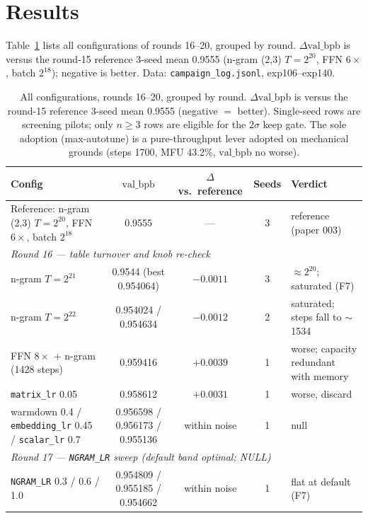 \documentclass{article}
\newcommand{\valbpb}{\mathrm{val\_bpb}}
\begin{document}
\section{Results}
\label{sec:results}

Table~\ref{tab:results} lists all configurations of rounds 16--20, grouped by round. $\Delta\valbpb$ is versus the round-15 reference 3-seed mean 0.9555 (n-gram (2,3) $T{=}2^{20}$, FFN $6\times$, batch $2^{18}$); negative is better. Data: \texttt{campaign\_log.jsonl}, exp106--exp140.

\begin{table}[t]
\caption{All configurations, rounds 16--20, grouped by round. $\Delta\valbpb$ is versus the round-15 reference 3-seed mean 0.9555 (negative $=$ better). Single-seed rows are screening pilots; only $n \geq 3$ rows are eligible for the $2\sigma$ keep gate. The sole adoption (max-autotune) is a pure-throughput lever adopted on mechanical grounds (steps 1700, MFU 43.2\%, $\valbpb$ no worse).}
\label{tab:results}
\vskip 0.15in
\begin{center}
\begin{small}
\begin{tabular}{lcccl}
\toprule
Config & $\valbpb$ & $\Delta$ vs.\ reference & Seeds & Verdict \\
\midrule
Reference: n-gram (2,3) $T{=}2^{20}$, FFN $6\times$, batch $2^{18}$ & 0.9555 & --- & 3 & reference (paper 003) \\
\midrule
\multicolumn{5}{l}{\emph{Round 16 --- table turnover and knob re-check}} \\
n-gram $T = 2^{21}$ & 0.9544 (best 0.954064) & $-0.0011$ & 3 & $\approx 2^{20}$; saturated (F7) \\
n-gram $T = 2^{22}$ & 0.954024 / 0.954634 & $-0.0012$ & 2 & saturated; steps fall to $\sim$1534 \\
FFN $8\times$ + n-gram (1428 steps) & 0.959416 & $+0.0039$ & 1 & worse; capacity redundant with memory \\
\texttt{matrix\_lr} 0.05 & 0.958612 & $+0.0031$ & 1 & worse, discard \\
warmdown 0.4 / \texttt{embedding\_lr} 0.45 / \texttt{scalar\_lr} 0.7 & 0.956598 / 0.956173 / 0.955136 & within noise & 1 & null \\
\midrule
\multicolumn{5}{l}{\emph{Round 17 --- \texttt{NGRAM\_LR} sweep (default band optimal; NULL)}} \\
\texttt{NGRAM\_LR} 0.3 / 0.6 / 1.0 & 0.954809 / 0.955185 / 0.954662 & within noise & 1 & flat at default (F7) \\

\end{tabular}
\end{small}
\end{center}
\end{table}
\end{document}
